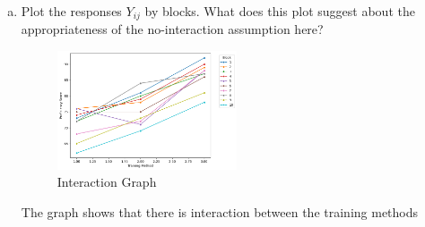 \documentclass{article}
\begin{document}
\begin{enumerate}[(a)]
	\item  Plot the responses $Y_{ij}$ by blocks. What does this plot suggest about the appropriateness of the no-interaction assumption here?
	      \begin{figure}[H]
		      \centering
		      \includegraphics[width=0.5\textwidth]{assets/interaction.png}
		      \caption{Interaction Graph}
	      \end{figure}
	      The graph shows that there is interaction between the training methods
\end{enumerate}
\end{document}
